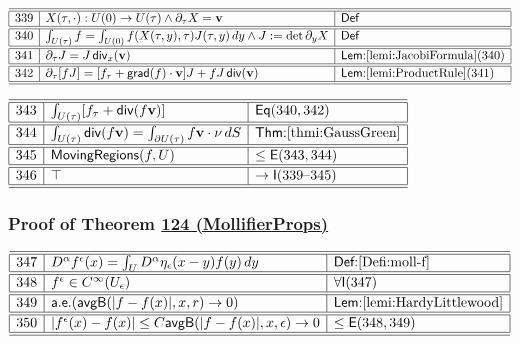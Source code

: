 \documentclass[11pt,reqno]{amsart}
\begin{document}
\noindent$%
\begin{array}{|r|l|l|}
\hline\hline
339 & X(\tau,\cdot):U(0)\to U(\tau)\wedge\partial_{\tau}X=\mathbf{v} & \mathsf{Def} \\ \hline\hline
340 & \int_{U(\tau)}f=\int_{U(0)}f(X(\tau,y),\tau)J(\tau,y)\,dy\wedge J:=\det\partial_{y}X & \mathsf{Def} \\ \hline\hline
341 & \partial_{\tau}J=J\,\mathsf{div}_{x}(\mathbf{v}) & \textsf{Lem:}\ref{lemi:JacobiFormula}(340) \\ \hline\hline
342 & \partial_{\tau}[fJ]=[f_{\tau}+\mathsf{grad}(f)\cdot\mathbf{v}]J+fJ\,\mathsf{div}(\mathbf{v}) & \textsf{Lem:}\ref{lemi:ProductRule}(341) \\ \hline\hline
\end{array}%
$

\medskip

\noindent$%
\begin{array}{|r|l|l|}
\hline\hline
343 & \int_{U(\tau)}[f_{\tau}+\mathsf{div}(f\mathbf{v})] & \mathsf{Eq}(340,342) \\ \hline\hline
344 & \int_{U(\tau)}\mathsf{div}(f\mathbf{v})=\int_{\partial U(\tau)}f\mathbf{v}\cdot\nu\,dS & \textsf{Thm:}\ref{thmi:GaussGreen} \\ \hline\hline
345 & \mathsf{MovingRegions}(f,U) & \le\mathsf{E}(343,344) \\ \hline\hline
346 & \top & \to\mathsf{I}(339\text{--}345) \\ \hline\hline
\end{array}%
$

\medskip

\subsubsection*{Proof of Theorem \hyperlink{thm:MollifierProps}{124 (\textsf{MollifierProps})}}

\noindent$%
\begin{array}{|r|l|l|}
\hline\hline
347 & D^{\alpha}f^{\epsilon}(x)=\int_{U}D^{\alpha}\eta_{\epsilon}(x-y)f(y)\,dy & \textsf{Def:}\ref{Defi:moll-f} \\ \hline\hline
348 & f^{\epsilon}\in C^{\infty}(U_{\epsilon}) & \forall\mathsf{I}(347) \\ \hline\hline
349 & \mathsf{a.e.}(\mathsf{avgB}(|f-f(x)|,x,r)\to0) & \textsf{Lem:}\ref{lemi:HardyLittlewood} \\ \hline\hline
350 & |f^{\epsilon}(x)-f(x)|\le C\mathsf{avgB}(|f-f(x)|,x,\epsilon)\to0 & \le\mathsf{E}(348,349) \\ \hline\hline
\end{array}%
$
\end{document}
